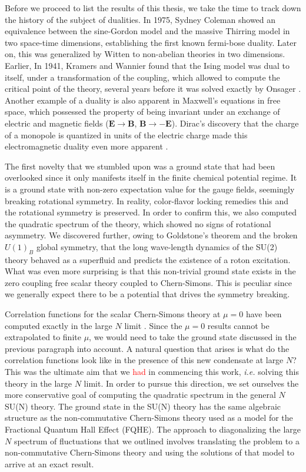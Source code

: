 Before we proceed to list the results of this thesis, we take the time to track down the history of the subject of dualities. In 1975, Sydney Coleman \cite{Coleman:1974bu} showed an equivalence between the sine-Gordon model and the massive Thirring model in two space-time dimensions, establishing the first known fermi-bose duality. Later on, this was generalized by Witten \cite{Witten:1983ar} to non-abelian theories in two dimensions. Earlier, In 1941, Kramers and Wannier \cite{Kramers:1941kn} found that the Ising model was dual to itself, under a transformation of the coupling, which allowed to compute the critical point of the theory, several years before it was solved exactly by Onsager \cite{Onsager:1943jn}. Another example of a duality is also apparent in Maxwell's equations in free space, which possessed the property of being invariant under an exchange of electric and magnetic fields ($\bm{E}\rightarrow \bm{B}$, $\bm{B}\rightarrow -\bm{E}$). Dirac's discovery that the charge of a monopole is quantized in units of the electric charge made this electromagnetic duality even more apparent \cite{Dirac:1931kp}.

The first novelty that we stumbled upon was a ground state that had been overlooked since it only manifests itself in the finite chemical potential regime. It is a ground state with non-zero expectation value for the gauge fields, seemingly breaking rotational symmetry. In reality, color-flavor locking remedies this and the rotational symmetry is preserved. In order to confirm this, we also computed the quadratic spectrum of the theory, which showed no signs of rotational asymmetry. We discovered further, owing to Goldstone's theorem and the broken $U(1)_B$ global symmetry, that the long wave-length dynamics of the SU(2) theory behaved as a superfluid and predicts the existence of a roton excitation. What was even more surprising is that this non-trivial ground state exists in the zero coupling free scalar theory coupled to Chern-Simons. This is peculiar since we generally expect there to be a potential that drives the symmetry breaking.

Correlation functions for the scalar Chern-Simons theory at $\mu=0$ have been computed exactly in the large $N$ limit \cite{Aharony:2012nh}. Since the $\mu =0$ results cannot be extrapolated to finite $\mu$, we would need to take the ground state discussed in the previous paragraph into account. A natural question that arises is what do the correlation functions look like in the presence of this new condensate at large $N$? This was the ultimate aim that we \textcolor{red}{had} in commencing this work, \textit{i.e.} solving this theory in the large $N$ limit. In order to pursue this direction, we set ourselves the more conservative goal of computing the quadratic spectrum in the general $N$ SU(N) theory. The ground state in the SU(N) theory has the same algebraic structure as the non-commutative Chern-Simons theory used as a model for the Fractional Quantum Hall Effect (FQHE). The approach to diagonalizing the large $N$ spectrum of fluctuations that we outlined involves translating the problem to a non-commutative Chern-Simons theory and using the solutions of that model to arrive at an exact result.


